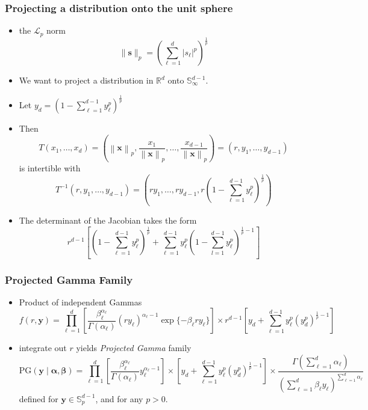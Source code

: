 \documentclass[aspectratio=169]{beamer}
\newcommand{\norm}[1]{\left\lVert #1 \right\rVert}
\newcommand{\pnorm}[2]{\norm{#1}_{#2}}
\begin{document}
\begin{frame}
  \frametitle{Projecting a distribution onto the unit sphere}
  \begin{itemize}
    \item the $\mathcal{L}_p$ norm
      \[
        \lVert \bm{s} \rVert_p = \left({\textstyle\sum}_{\ell = 1}^d
          \lvert s_{\ell}\rvert^p\right)^{\frac{1}{p}}
      \]
      \pause
    \item We want to project a distribution in ${\mathbb R}^d$ onto ${\mathbb S}_{\infty}^{d-1}$.
    \item Let $y_d = \left(1 - {\textstyle\sum}_{\ell = 1}^{d-
      1}y_{\ell}^p\right)^{\frac{1}{p}}$
    \item Then
      \[
        T(x_1,\ldots,x_d) = \left(\pnorm{\bm{x}}{p},
          \frac{x_1}{\pnorm{\bm{x}}{p}}, \ldots ,
          \frac{x_{d-1}}{\pnorm{\bm{x}}{p}}\right) = (r,y_1,\ldots,y_{d-1})
      \]
    is intertible with
      \[
        T^{-1}\left(r,y_1,\ldots,y_{d-1}\right) =
          \left(ry_1,\ldots,ry_{d-1}, r\left(1 -
            {\textstyle\sum}_{\ell = 1}^{d-
            1}y_{\ell}^p\right)^{\frac{1}{p}}\right)
      \]
    \item The determinant of the Jacobian takes the form
      \[
        r^{d-1}\left[\left(1 - {\textstyle\sum}_{\ell = 1}^{d
          -1}y_{\ell}^p\right)^{\frac{1}{p}} +
          {\textstyle\sum}_{\ell = 1}^{d-1}y_{\ell}^p\left(1 - {\textstyle\sum}_{l=1}^{d-1} y_{\ell}^p\right)^{\frac{1}{p} - 1}\right]
      \]
    \end{itemize}
\end{frame}

\begin{frame}
  \frametitle{Projected Gamma Family}
  \begin{itemize}
    \item Product of independent Gammas
      \[
        f(r,\bm{ y}) = \prod_{\ell = 1}^{d}
          \left[\frac{\beta_{\ell}^{\alpha_{\ell}}}{
            \Gamma(\alpha_{\ell})}(ry_{\ell})^{\alpha_{\ell} - 1}
            \exp\lbrace-\beta_{\ell}ry_{\ell}\rbrace\right]
        \times r^{d-1}\left[y_d +
              {\textstyle \sum}_{\ell = 1}^{d-1}y_{\ell}^p\left(y_d^p\right)^{\frac{1}{p} - 1}\right]
      \]
    \item integrate out $r$ yields \emph{Projected Gamma} family
      \[
        \text{PG}(\bm{ y}\mid\bm{ \alpha},\bm{ \beta}) =
            \prod_{\ell = 1}^d\left[
            \frac{\beta_{\ell}^{\alpha_{\ell}}}{\Gamma(\alpha_{\ell})}
                  y_{\ell}^{\alpha_{\ell} - 1}\right]
        \times \left[y_d +
            {\textstyle \sum}_{\ell = 1}^{d-
            1}y_{\ell}^p\left(y_d^p\right)^{\frac{1}{p} - 1}\right]
        \times \frac{\Gamma({\textstyle\sum}_{\ell =
         1}^d\alpha_{\ell})}{\left({\textstyle\sum}_{\ell = 1}^d
                      \beta_{\ell}y_{\ell}\right)^{{\scriptstyle\sum_{\ell =
                       1}^d \alpha_{\ell}}}}
      \]
      defined for $\bm{y}\in {\mathbb S}_p^{d-1}$, and for any $p>0$.
  \end{itemize}
\end{frame}
\end{document}
